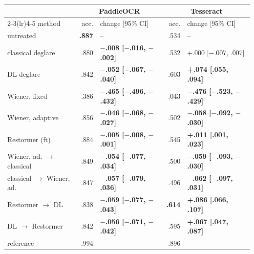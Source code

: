 \begin{tabular}{lrlrl}
\toprule
 & \multicolumn{2}{c}{PaddleOCR} & \multicolumn{2}{c}{Tesseract} \\
\cmidrule(lr){2-3}\cmidrule(lr){4-5}
method & acc. & change [95\% CI] & acc. & change [95\% CI] \\
\midrule
untreated & \textbf{.887} & -- & .534 & -- \\
classical deglare & .880 & \textbf{$-$.008 [$-$.016, $-$.002]} & .532 & +.000 [$-$.007, .007] \\
DL deglare & .842 & \textbf{$-$.052 [$-$.067, $-$.040]} & .603 & \textbf{+.074 [.055, .094]} \\
Wiener, fixed & .386 & \textbf{$-$.465 [$-$.496, $-$.432]} & .043 & \textbf{$-$.476 [$-$.523, $-$.429]} \\
Wiener, adaptive & .856 & \textbf{$-$.046 [$-$.068, $-$.027]} & .502 & \textbf{$-$.058 [$-$.092, $-$.030]} \\
Restormer (ft) & .884 & \textbf{$-$.005 [$-$.008, $-$.001]} & .545 & \textbf{+.011 [.001, .023]} \\
Wiener, ad. $\rightarrow$ classical & .849 & \textbf{$-$.054 [$-$.077, $-$.034]} & .500 & \textbf{$-$.059 [$-$.093, $-$.030]} \\
classical $\rightarrow$ Wiener, ad. & .847 & \textbf{$-$.057 [$-$.079, $-$.036]} & .496 & \textbf{$-$.062 [$-$.097, $-$.031]} \\
Restormer $\rightarrow$ DL & .838 & \textbf{$-$.059 [$-$.077, $-$.043]} & \textbf{.614} & \textbf{+.086 [.066, .107]} \\
DL $\rightarrow$ Restormer & .842 & \textbf{$-$.056 [$-$.071, $-$.042]} & .595 & \textbf{+.067 [.047, .087]} \\
\midrule
reference & .994 & -- & .896 & -- \\
\bottomrule
\end{tabular}
